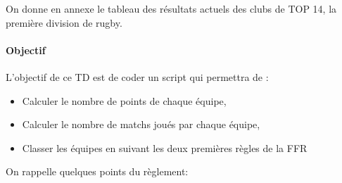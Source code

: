 




 
On donne en annexe le tableau des résultats actuels des clubs de TOP 14, la première division de rugby.

\paragraph{Objectif}

L'objectif de ce TD est de coder un script qui permettra de :
\begin{itemize}
 \item Calculer le nombre de points de chaque équipe,
 \item Calculer le nombre de matchs joués par chaque équipe,
 \item Classer les équipes en suivant les deux premières règles de la FFR
\end{itemize}

On rappelle quelques points du règlement:

